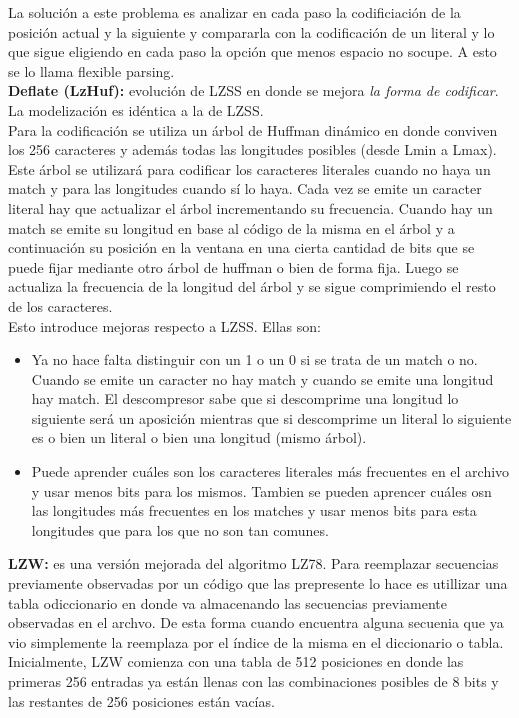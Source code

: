\documentclass[titlepage,a4paper]{article}
\begin{document}
La solución a este problema es analizar en cada paso la codificiación de la posición actual y la siguiente y compararla con la codificación de un literal y lo que sigue eligiendo en cada paso la opción que menos espacio no socupe. A esto se lo llama flexible parsing. \\

\textbf{Deflate (LzHuf):} evolución de LZSS en donde se mejora \emph{la forma de codificar}. La modelización es idéntica a la de LZSS. \\

Para la codificación se utiliza un árbol de Huffman dinámico en donde conviven los 256 caracteres y además todas las longitudes posibles (desde Lmin a Lmax).  Este árbol se utilizará para codificar los caracteres literales cuando no haya un match y para las longitudes cuando sí lo haya.  Cada vez se emite un caracter literal hay que actualizar el árbol incrementando su frecuencia. Cuando hay un match se emite su longitud en base al código de la misma en el árbol y a continuación su posición en la ventana en una cierta cantidad de bits que se puede fijar mediante otro árbol de huffman o bien de forma fija. Luego se actualiza la frecuencia de la longitud del árbol y se sigue comprimiendo el resto de los caracteres. \\

Esto introduce mejoras respecto a LZSS. Ellas son:
\begin{itemize}
\item Ya no hace falta distinguir con un 1 o un 0 si se trata de un match o no. Cuando se emite un caracter no hay match y cuando se emite una longitud hay match. El descompresor sabe que si descomprime una longitud lo siguiente será un aposición mientras que si descomprime un literal lo siguiente es o bien un literal o bien una longitud (mismo árbol).  
\item Puede aprender cuáles son los caracteres literales más frecuentes en el archivo y usar menos bits para los mismos. Tambien se pueden aprencer cuáles osn las longitudes más frecuentes en los matches y usar menos bits para esta longitudes que para los que no son tan comunes. 
\end{itemize}

\textbf{LZW:} es una versión mejorada del algoritmo LZ78. Para reemplazar secuencias previamente observadas por un código  que las prepresente lo hace es utillizar una tabla odiccionario en donde va almacenando las secuencias previamente observadas en el archvo. De esta forma cuando encuentra alguna secuenia que ya vio simplemente la reemplaza por el índice de la misma en el diccionario o tabla. \\
Inicialmente, LZW comienza con una tabla de 512 posiciones en donde las primeras 256 entradas ya están llenas con las combinaciones posibles de 8 bits y las restantes de 256 posiciones están vacías. \\
\end{document}
